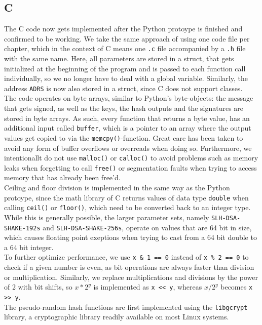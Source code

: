 \documentclass[journal=tosc,notanonymous]{iacrtrans}
\begin{document}
\subsection{C}

The C code now gets implemented after the Python protoype is finished and confirmed to be working.
We take the same approach of using one code file per chapter, which in the context of C means one \texttt{.c} file accompanied by a \texttt{.h} file with the same name.
Here, all parameters are stored in a struct, that gets initialized at the beginning of the program and is passed to each function call individually, so we no longer have to deal with a global variable.
Similarly, the address \texttt{ADRS} is now also stored in a struct, since C does not support classes.
\\
The code operates on byte arrays, similar to Python's byte-objects: the message that gets signed, as well as the keys, the hash outputs and the signatures are stored in byte arrays.
As such, every function that returns a byte value, has an additional input called \texttt{buffer}, which is a pointer to an array where the output values get copied to via the \texttt{memcpy()}-function.
Great care has been taken to avoid any form of buffer overflows or overreads when doing so.
Furthermore, we intentionallt do not use \texttt{malloc()} or \texttt{calloc()} to avoid problems such as memory leaks when forgetting to call \texttt{free()} or segmentation faults when trying to access memory that has already been free'd.
\\
Ceiling and floor division is implemented in the same way as the Python protoype, since the math library of C returns values of data type \texttt{double} when calling \texttt{ceil()} or \texttt{floor()}, which need to be converted back to an integer type.
While this is generally possible, the larger parameter sets, namely \texttt{SLH-DSA-SHAKE-192s} and \texttt{SLH-DSA-SHAKE-256s}, operate on values that are 64 bit in size, which causes floating point exeptions when trying to cast from a 64 bit double to a 64 bit integer.
\\
To further optimize performance, we use \texttt{x \& 1 == 0} instead of \texttt{x \% 2 == 0} to check if a given number is even, as bit operations are always faster than division or multiplication.
Similarly, we replace multiplications and divisions by the power of 2 with bit shifts, so $x * 2^y$ is implemented as \texttt{x << y}, whereas $x / 2^y$ becomes \texttt{x >> y}.
\\
The pseudo-random hash functions are first implemented using the \texttt{libgcrypt} library, a cryptographic library readily available on most Linux systems.
\end{document}
